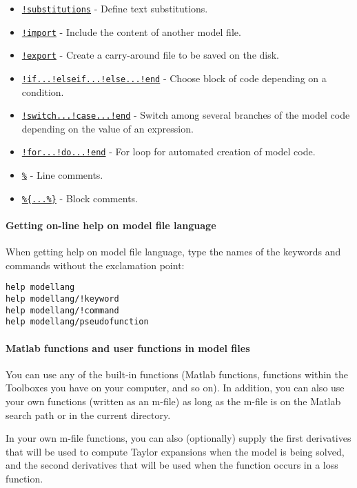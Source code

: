 \begin{itemize}
\itemsep1pt\parskip0pt
\item
  \href{modellang/substitutions}{\texttt{!substitutions}} - Define text
  substitutions.
\item
  \href{modellang/import}{\texttt{!import}} - Include the content of
  another model file.
\item
  \href{modellang/export}{\texttt{!export}} - Create a carry-around file
  to be saved on the disk.
\item
  \href{modellang/if}{\texttt{!if...!elseif...!else...!end}} - Choose
  block of code depending on a condition.
\item
  \href{modellang/switch}{\texttt{!switch...!case...!end}} - Switch
  among several branches of the model code depending on the value of an
  expression.
\item
  \href{modellang/for}{\texttt{!for...!do...!end}} - For loop for
  automated creation of model code.
\item
  \href{modellang/linecomments}{\texttt{\%}} - Line comments.
\item
  \href{modellang/blockcomments}{\texttt{\%\{...\%\}}} - Block comments.
\end{itemize}

\paragraph{Getting on-line help on model file
language}

When getting help on model file language, type the names of the keywords
and commands without the exclamation point:

\begin{verbatim}
help modellang
help modellang/!keyword
help modellang/!command 
help modellang/pseudofunction
\end{verbatim}

\paragraph{Matlab functions and user functions in model
files}

You can use any of the built-in functions (Matlab functions, functions
within the Toolboxes you have on your computer, and so on). In addition,
you can also use your own functions (written as an m-file) as long as
the m-file is on the Matlab search path or in the current directory.

In your own m-file functions, you can also (optionally) supply the first
derivatives that will be used to compute Taylor expansions when the
model is being solved, and the second derivatives that will be used when
the function occurs in a loss function.


